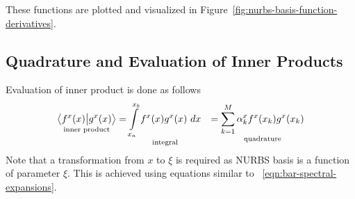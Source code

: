 \documentclass[submit,12pt]{aiaa-pretty} %
\begin{document}
These functions are plotted and visualized in Figure~\ref{fig:nurbs-basis-function-derivatives}.

\subsection{Quadrature and Evaluation of Inner Products}
Evaluation of inner product is done as follows
\begin{equation}\nonumber
  \begin{aligned}
    \underset{\text{inner~product}}{\left\langle {\color{black}{f^x(x)}} \big\vert  {\color{black}{g^x(x)}} \right\rangle} &= \underset{\text{integral}}{\int\limits_{x_a}^{x_b}  {\color{black}{f^x(x)}}  {\color{black}{g^x(x)}}~dx} &= \underset{\text{quadrature}}{\sum_{k=1}^M \alpha_k^x  {\color{black}{f^x(x_k)}}  {\color{black}{g^x(x_k)}}}\\
  \end{aligned}
\end{equation}  
Note that a transformation from $x$ to $\xi$ is required as NURBS
basis is a function of parameter $\xi$. This is achieved using
equations similar to ~\ref{eqn:bar-spectral-expansions}.
\end{document}
